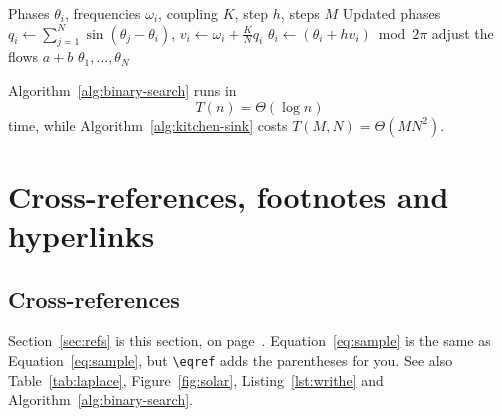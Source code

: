 \documentclass[11pt,a4paper]{article}
\theoremstyle{definition}                   %
\begin{document}
\begin{algorithm}[H]
    \caption{Every other control structure in one place}
    \label{alg:kitchen-sink}
    \begin{algorithmic}[1]
        \Require Phases $\theta_i$, frequencies $\omega_i$, coupling $K$,
                 step $h$, steps $M$
        \Ensure  Updated phases
                \State $q_i \gets \sum_{j=1}^{N}\sin(\theta_j-\theta_i)$,
                       $v_i \gets \omega_i + \frac{K}{N} q_i$
            \EndFor
            \State $\theta_i \gets (\theta_i + h v_i) \bmod 2\pi$
        \EndFor
        \Repeat
            \State adjust the flows
            \State \Return $a + b$
        \EndFunction
        \State \Return $\theta_1, \dots, \theta_N$
    \end{algorithmic}
\end{algorithm}

Algorithm~\ref{alg:binary-search} runs in
\[ T(n) = \Theta(\log n) \]
time, while Algorithm~\ref{alg:kitchen-sink} costs $T(M,N) = \Theta(MN^2)$.


\section{Cross-references, footnotes and hyperlinks}

\subsection{Cross-references}
%
%
%
Section~\ref{sec:refs} is this section, on page~\pageref{sec:refs}.
Equation~\ref{eq:sample} is the same as Equation~\eqref{eq:sample}, but
\verb|\eqref| adds the parentheses for you.
See also Table~\ref{tab:laplace}, Figure~\ref{fig:solar},
Listing~\ref{lst:writhe} and Algorithm~\ref{alg:binary-search}.
\label{sec:refs}
\end{document}
